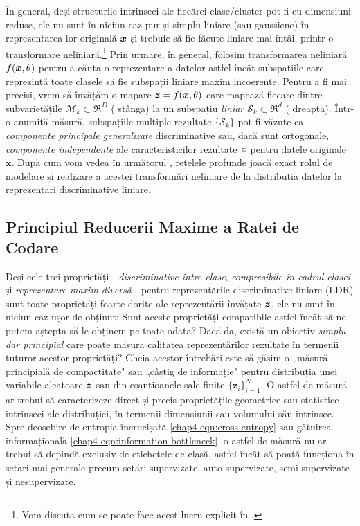\documentclass[../../book-main_ro.tex]{subfiles}
\begin{document}
În general, deși structurile intrinseci ale fiecărei clase/cluster pot fi cu dimensiuni reduse, ele nu sunt în niciun caz pur și simplu liniare (sau gaussiene) în reprezentarea lor originală $\bm{x}$ și trebuie să fie făcute liniare mai întâi, printr-o transformare neliniară.\footnote{Vom discuta cum se poate face acest lucru explicit în .} Prin urmare, în general, folosim transformarea neliniară $f(\bm{x},\theta)$ pentru a căuta o reprezentare a datelor astfel încât subspațiile care reprezintă toate clasele să fie subspații liniare maxim incoerente. Pentru a fi mai preciși, vrem să învățăm o mapare {$\bm{z} = f(\bm{x},\theta)$} care mapează fiecare dintre subvarietățile $\mathcal{M}_k \subset \Re^D$ ( stânga) la un subspațiu {\em liniar} $\mathcal{S}_k \subset \Re^d$ ( dreapta). Într-o anumită măsură, subspațiile multiple rezultate $\{\mathcal{S}_k\}$ pot fi văzute ca {\em componente principale generalizate} discriminative \cite{GPCA} sau, dacă sunt ortogonale, {\em componente independente} \cite{hyvarinen2000independent} ale caracteristicilor rezultate $\bm{z}$ pentru datele originale $\bm x$.
După cum vom vedea în următorul , rețelele profunde joacă exact rolul de modelare și realizare a acestei transformări neliniare de la distribuția datelor la reprezentări discriminative liniare.

\subsection{Principiul Reducerii Maxime a Ratei de Codare}\label{subsec:MCR2}

Deși cele trei proprietăți---{\em discriminative între clase}, {\em compresibile în cadrul clasei} și {\em reprezentare maxim diversă}---pentru reprezentările discriminative liniare (LDR) sunt toate proprietăți foarte dorite ale reprezentării învățate $\bm{z}$, ele nu sunt în niciun caz ușor de obținut: Sunt aceste proprietăți compatibile astfel încât să ne putem aștepta să le obținem pe toate odată? Dacă da, există un obiectiv {\em simplu dar principial} care poate măsura calitatea reprezentărilor rezultate în termenii tuturor acestor proprietăți? Cheia acestor întrebări {este să găsim} o „măsură principială de compactitate" sau „câștig de informație" pentru distribuția unei variabile aleatoare $\bm{z}$ sau din eșantioanele sale finite $\{\bm z_i\}_{i=1}^N$. O astfel de măsură ar trebui să caracterizeze direct și precis proprietățile geometrice sau statistice intrinseci ale distribuției, în termenii dimensiunii sau {volumului} său intrinsec. Spre deosebire de entropia încrucișată \eqref{chap4-eqn:cross-entropy} sau gâtuirea informațională \eqref{chap4-eqn:information-bottleneck}, o astfel de măsură nu ar trebui să depindă exclusiv de etichetele de clasă, astfel încât să poată funcționa în setări mai generale precum setări supervizate, auto-supervizate, semi-supervizate și nesupervizate.
\end{document}
